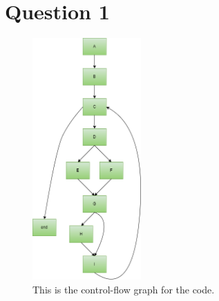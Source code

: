 \section{Question 1}

\begin{figure}[H]
    \centering
    \includegraphics[height=350px]{images/Ass3.drawio.png}
    \caption{This is the control-flow graph for the code.}
    \label{fig:flow}
\end{figure}